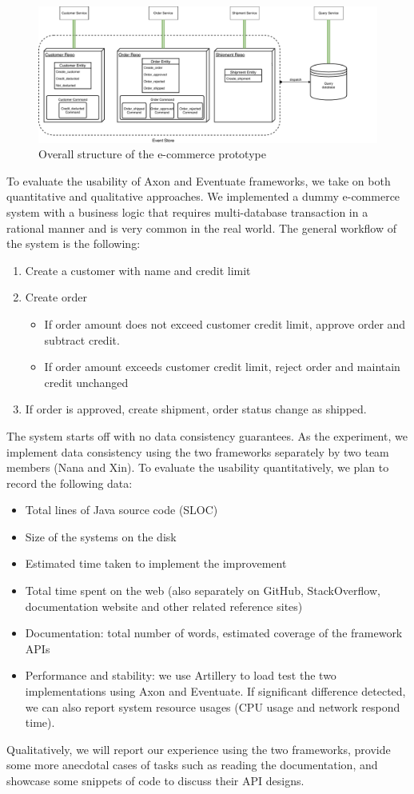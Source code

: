 \begin{figure}[H]
    \centering
    \includegraphics[width=17cm]{assets/arch.pdf}
    \nocaptionrule \caption{\label{fig:arch} Overall structure of the e-commerce prototype}
\end{figure}

To evaluate the usability of Axon and Eventuate frameworks, we take on both quantitative and qualitative approaches. We implemented a dummy e-commerce system with a business logic that requires multi-database transaction in a rational manner and is very common in the real world. The general workflow of the system is the following:

\begin{enumerate}
    \item Create a customer with name and credit limit
    \item Create order
    \begin{itemize}
        \item If order amount does not exceed customer credit limit, approve order and subtract credit.
        \item If order amount exceeds customer credit limit, reject order and maintain credit unchanged
    \end{itemize}
    \item If order is approved, create shipment, order status change as shipped.
\end{enumerate}

The system starts off with no data consistency guarantees. As the experiment, we implement data consistency using the two frameworks separately by two team members (Nana and Xin). To evaluate the usability quantitatively, we plan to record the following data:

\begin{itemize}
    \item Total lines of Java source code (SLOC)
    \item Size of the systems on the disk
    \item Estimated time taken to implement the improvement
    \item Total time spent on the web (also separately on GitHub, StackOverflow, documentation website and other related reference sites)
    \item Documentation: total number of words, estimated coverage of the framework APIs
    \item Performance and stability: we use Artillery to load test the two implementations using Axon and Eventuate. If significant difference detected, we can also report system resource usages (CPU usage and network respond time).
\end{itemize}

Qualitatively, we will report our experience using the two frameworks, provide some more anecdotal cases of tasks such as reading the documentation, and showcase some snippets of code to discuss their API designs.
